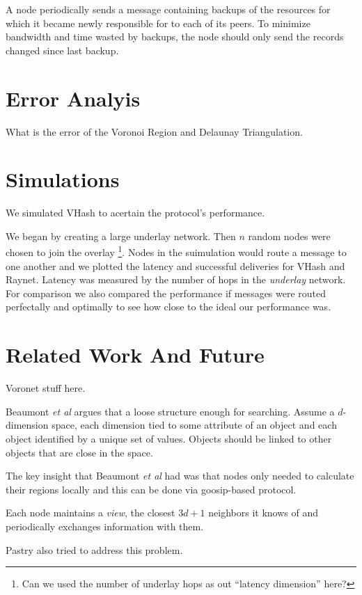 \documentclass{IEEEtran}
\begin{document}
A node periodically sends a message containing backups of the resources for which it became newly responsible for to each of its peers. To minimize bandwidth and time wasted by backups, the node should only send the records changed since last backup.





\section{Error Analyis}
What is the error of the Voronoi Region and Delaunay Triangulation.


\section{Simulations}
We simulated VHash to acertain the protocol's performance. 


We began by creating a large underlay network.  Then $n$ random nodes were chosen to join the overlay \footnote{Can we used the number of underlay hops as out ``latency dimension'' here? }.  Nodes in the suimulation would route a message to one another and we plotted the latency and successful deliveries for VHash and Raynet.  Latency was measured by the number of hops in the \textit{underlay} network.  For comparison we also compared the performance if messages were routed perfectally and optimally to see how close to the ideal our performance was. 




\section{Related Work And Future}
Voronet stuff here.


Beaumont \textit{et al} \cite{raynet}  argues that a loose structure enough for searching.  Assume a $d$-dimension space, each dimension tied to some attribute of an object and each object identified by a unique set of values.  Objects should be linked to other objects that are close in the space.
 

The key insight that Beaumont \textit{et al} had  was that nodes only needed to calculate their regions locally and this can be done via goosip-based protocol.

Each node maintains a \textit{view}, the closest $3d+1$ neighbors it knows of and periodically exchanges information with them.


Pastry also tried to address this problem.
\end{document}
